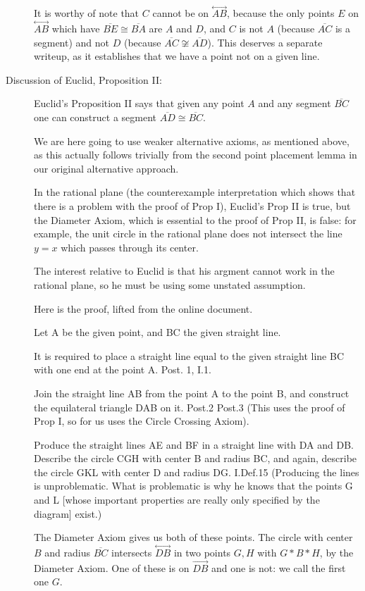\documentclass[12pt]{article}
\newcommand\Line[1]{\overset{\leftrightarrow}{#1}}
\begin{document}
\begin{description}
It is worthy of note that $C$ cannot be on $\Line{AB}$, because the only points $E$ on $\Line{AB}$ which have $\overline{BE} \cong \overline{BA}$ are $A$ and $D$, and $C$ is not $A$ (because $\overline{AC}$ is a segment) and not $D$ (because $\overline{AC} \not\cong \overline{AD}$).  This deserves a separate writeup, as it establishes that we have a point not on a given line.

\item[Discussion of Euclid, Proposition II:]  Euclid's Proposition II says that given any point $A$ and any segment $\overline{BC}$ one can construct a segment $\overline{AD} \cong \overline{BC}$.  

We are here going to use weaker alternative axioms, as mentioned above, as this actually follows trivially from the second point placement lemma in our original alternative approach.


In the rational plane (the counterexample interpretation which shows that there is a problem with the proof of Prop I), Euclid's Prop II is true, but the Diameter Axiom, which is essential to the proof of Prop II, is false:
for example, the unit circle in the rational plane does not intersect the line $y=x$ which passes through its center.

The interest relative to Euclid is that his argment cannot work in the rational plane, so he must be using some unstated assumption.  

Here is the proof, lifted from the online document.

Let A be the given point, and BC the given straight line. 

It is required to place a straight line equal to the given straight line BC with one end at the point A.
Post. 1, I.1.

Join the straight line AB from the point A to the point B, and construct the equilateral triangle DAB on it.
Post.2
Post.3  (This uses the proof of Prop I, so for us uses the Circle Crossing Axiom).

Produce the straight lines AE and BF in a straight line with DA and DB. Describe the circle CGH with center B and radius BC, and again, describe the circle GKL with center D and radius DG.
I.Def.15  (Producing the lines is unproblematic.  What is problematic is why he knows that the points G and  L [whose important properties are really only specified by the diagram] exist.)

The Diameter Axiom gives us both of these points.  The circle with center $B$ and radius $\overline{BC}$ intersects $\Line{DB}$ in two points $G,H$ with $G*B*H$, by the Diameter Axiom.  One of these
is on $\overrightarrow{DB}$ and one is not:  we call the first one $G$.


\end{description}
\end{document}
